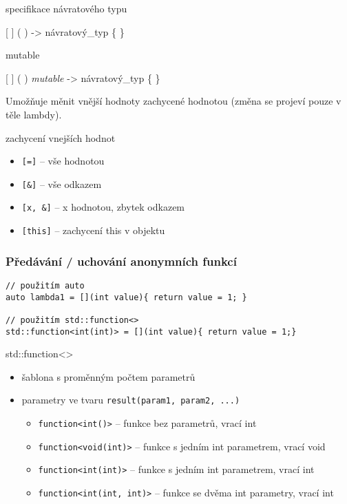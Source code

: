 \begin{frame}[fragile]
\begin{noteblock}{specifikace návratového typu}
\begin{center}
[ ] ( ) -> návratový\_typ \{ \}
\end{center}
\end{noteblock}

\begin{noteblock}{mutable}
\begin{center}
[ ] ( ) \textit{mutable} -> návratový\_typ \{ \}
\end{center}

Umožňuje měnit vnější hodnoty zachycené hodnotou (změna se projeví pouze v těle lambdy).
\end{noteblock}

\begin{block}{zachycení vnejších hodnot}
\begin{itemize}
\item \lstinline |[=]| -- vše hodnotou
\item \lstinline |[&]| -- vše odkazem
\item \lstinline |[x, &]| -- x hodnotou, zbytek odkazem
\item \lstinline |[this]| -- zachycení this v objektu 
\end{itemize}
\end{block}
\end{frame}

\begin{frame}[fragile]
\frametitle{Předávání / uchování anonymních funkcí}
\begin{yesblock}
\begin{lstlisting}
// použitím auto
auto lambda1 = [](int value){ return value = 1; }

// použitím std::function<>
std::function<int(int)> = [](int value){ return value = 1;}
\end{lstlisting}
\end{yesblock}

\begin{block}{std::function<>}
\begin{itemize}
\item šablona s proměnným počtem parametrů
\item parametry ve tvaru \lstinline|result(param1, param2, ...)|
\begin{itemize}
\item \lstinline|function<int()>| -- funkce bez parametrů, vrací int
\item \lstinline|function<void(int)>| -- funkce s jedním int parametrem, vrací void
\item \lstinline|function<int(int)>| -- funkce s jedním int parametrem, vrací int
\item \lstinline|function<int(int, int)>| -- funkce se dvěma int parametry, vrací int
\end{itemize}

\end{itemize}
\end{block}
\end{frame}


